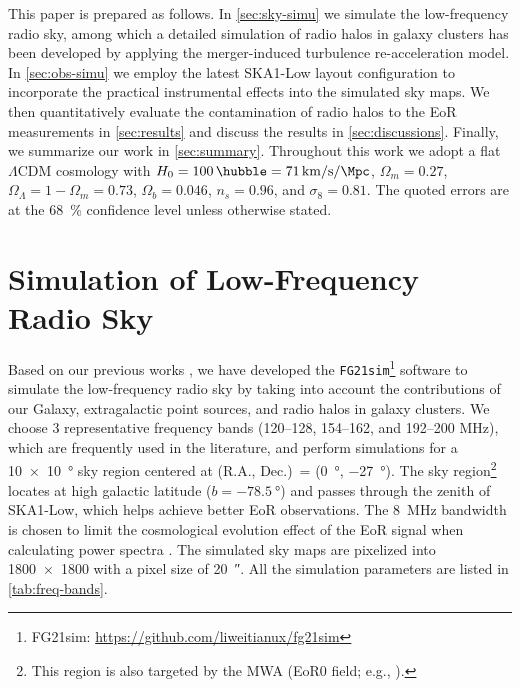 \documentclass[modern]{aastex62}
\newcommand{\lcdm}{$\Lambda$CDM}
\begin{document}
This paper is prepared as follows.
In \autoref{sec:sky-simu} we simulate the low-frequency radio sky, among
which a detailed simulation of radio halos in galaxy clusters has been
developed by applying the merger-induced turbulence re-acceleration model.
In \autoref{sec:obs-simu} we employ the latest SKA1-Low layout
configuration to incorporate the practical instrumental effects into
the simulated sky maps.
We then quantitatively evaluate the contamination of radio halos to the
EoR measurements in \autoref{sec:results} and discuss the results in
\autoref{sec:discussions}.
Finally, we summarize our work in \autoref{sec:summary}.
Throughout this work we adopt a flat \lcdm{} cosmology with
$H_0 = \SI{100}{\hubble} = \SI{71}{\km\per\second\per\Mpc}$,
$\Omega_m = 0.27$, $\Omega_{\Lambda} = 1 - \Omega_m = 0.73$,
$\Omega_b = 0.046$, $n_s = 0.96$, and $\sigma_8 = 0.81$.
The quoted errors are at the \SI{68}{\percent} confidence level unless
otherwise stated.


\section{Simulation of Low-Frequency Radio Sky}
\label{sec:sky-simu}

Based on our previous works \citep{wang2010,wang2013}, we have developed
the \texttt{FG21sim}\footnote{%
  FG21sim: \url{https://github.com/liweitianux/fg21sim}}
software to simulate the low-frequency
radio sky by taking into account the contributions of our Galaxy,
extragalactic point sources, and radio halos in galaxy clusters.
{\color{cyan}%
We choose 3 representative frequency bands (\numrange{120}{128},
\numrange{154}{162}, and \numrange{192}{200} \si{\MHz}), which are
frequently used in the literature, and perform simulations for a
\SI[product-units=repeat]{10 x 10}{\degree} sky region centered at
(R.A., Dec.)\ = (\SI{0}{\degree}, \SI{-27}{\degree}).
The sky region\footnote{This region is also targeted by the MWA
  (EoR0 field; e.g., \citealt{beardsley2016}).}
locates at high galactic latitude ($b = \SI{-78.5}{\degree}$)
and passes through the zenith of SKA1-Low,
which helps achieve better EoR observations.
The \SI{8}{\MHz} bandwidth is chosen to limit the cosmological evolution
effect of the EoR signal when calculating power spectra
\citep[e.g.][]{wyithe2004,thyagarajan2013}.
The simulated sky maps are pixelized into \num{1800 x 1800} with a pixel
size of \SI{20}{\arcsecond}.
All the simulation parameters are listed in \autoref{tab:freq-bands}.} %
\end{document}
